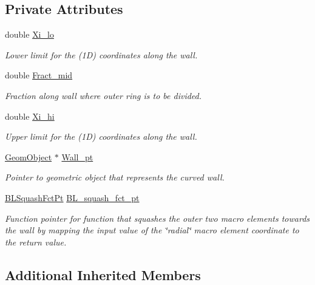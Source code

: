 \subsection*{Private Attributes}
\begin{DoxyCompactItemize}
\item 
double \hyperlink{classoomph_1_1QuarterCircleSectorDomain_afed5ccc21ccf6c6cd1dca65d58a5b708}{Xi\+\_\+lo}
\begin{DoxyCompactList}\small\item\em Lower limit for the (1D) coordinates along the wall. \end{DoxyCompactList}\item 
double \hyperlink{classoomph_1_1QuarterCircleSectorDomain_ade78897c44c26af82ac90052f799796c}{Fract\+\_\+mid}
\begin{DoxyCompactList}\small\item\em Fraction along wall where outer ring is to be divided. \end{DoxyCompactList}\item 
double \hyperlink{classoomph_1_1QuarterCircleSectorDomain_aba0cc67782144fe066dd0d04ac9d79dd}{Xi\+\_\+hi}
\begin{DoxyCompactList}\small\item\em Upper limit for the (1D) coordinates along the wall. \end{DoxyCompactList}\item 
\hyperlink{classoomph_1_1GeomObject}{Geom\+Object} $\ast$ \hyperlink{classoomph_1_1QuarterCircleSectorDomain_a59722c43d41fef0bc3df4cf6571930a8}{Wall\+\_\+pt}
\begin{DoxyCompactList}\small\item\em Pointer to geometric object that represents the curved wall. \end{DoxyCompactList}\item 
\hyperlink{classoomph_1_1QuarterCircleSectorDomain_a6cffab57f87c9f4ab01744647240bb1e}{B\+L\+Squash\+Fct\+Pt} \hyperlink{classoomph_1_1QuarterCircleSectorDomain_ae9b74ffcade9fdc1eeba26b4acced7a8}{B\+L\+\_\+squash\+\_\+fct\+\_\+pt}
\begin{DoxyCompactList}\small\item\em Function pointer for function that squashes the outer two macro elements towards the wall by mapping the input value of the \char`\"{}radial\char`\"{} macro element coordinate to the return value. \end{DoxyCompactList}\end{DoxyCompactItemize}
\subsection*{Additional Inherited Members}


